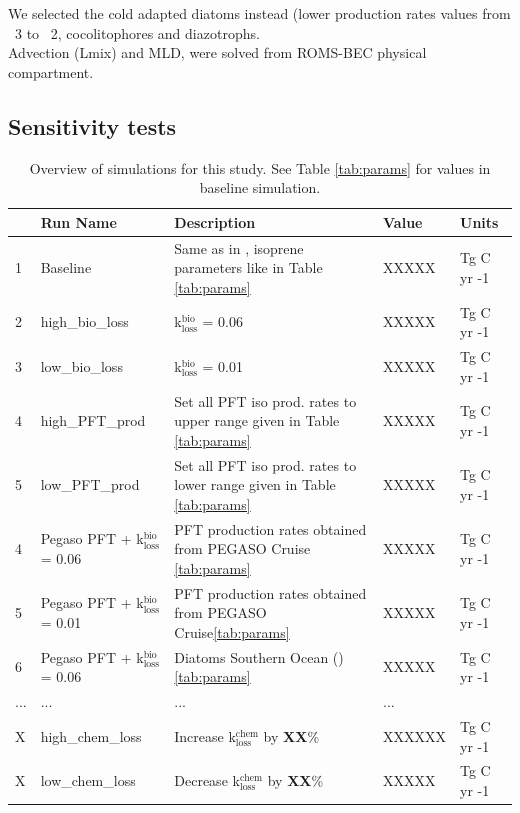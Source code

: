 \documentclass[draft,linenumbers]{agujournal}
\begin{document}
We selected the cold adapted diatoms instead (lower production rates values from ~3 to ~2, cocolitophores and diazotrophs.\\
Advection (Lmix) and MLD, were solved from ROMS-BEC physical compartment.\\

\subsection{Sensitivity tests}
\begin{table}
\caption{Overview of simulations for this study. See Table \ref{tab:params} for values in baseline simulation.}
\label{tab:model_runs}
\centering
\begin{tabular}{ l l l l l} 
\hline
 & \textbf{Run Name} 		& \textbf{Description} 	   & \textbf{Value}  & \textbf{Units}\\\hline
1 & Baseline			   	& Same as in \citet{Nissen2018}, isoprene parameters like in Table \ref{tab:params}  & XXXXX &Tg C yr -1\\
2 & high\_bio\_loss 		&  k$_{\mathrm{loss}}^{\mathrm{bio}}$ = 0.06 &  XXXXX &Tg C yr -1 \\
3 & low\_bio\_loss 		&  k$_{\mathrm{loss}}^{\mathrm{bio}}$ = 0.01 & XXXXX &Tg C yr -1\\
4 & high\_PFT\_prod 		& Set all PFT iso prod. rates to upper range given in Table \ref{tab:params}   & XXXXX  &Tg C yr -1\\
5 & low\_PFT\_prod 		    &  Set all PFT iso prod. rates to lower range given in Table \ref{tab:params} & XXXXX &Tg C yr -1\\
4 & Pegaso PFT +  k$_{\mathrm{loss}}^{\mathrm{bio}}$ = 0.06		& PFT production rates obtained from PEGASO Cruise \ref{tab:params}   & XXXXX  &Tg C yr -1\\
5 & Pegaso PFT +  k$_{\mathrm{loss}}^{\mathrm{bio}}$ = 0.01       & PFT production rates obtained from PEGASO Cruise\ref{tab:params} &  XXXXX &Tg C yr -1\\
6 & Pegaso PFT +  k$_{\mathrm{loss}}^{\mathrm{bio}}$ = 0.06       & Diatoms Southern Ocean (\citep{booge2016can})\ref{tab:params} & XXXXX  &Tg C yr -1\\
... & ... & ... & ... & \\
X & high\_chem\_loss 		&  Increase k$_{\mathrm{loss}}^{\mathrm{chem}}$ by \textbf{XX}\% & XXXXXX &Tg C yr -1\\
X & low\_chem\_loss 		&  Decrease k$_{\mathrm{loss}}^{\mathrm{chem}}$ by \textbf{XX}\% & XXXXX &Tg C yr -1\\
\hline
\end{tabular}%
\end{table}
\end{document}
